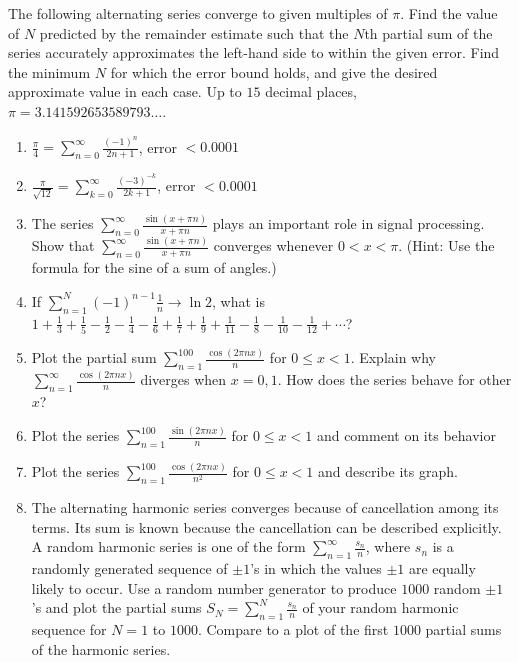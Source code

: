 \documentclass{exercises}
\begin{document}
The following alternating series converge to given multiples of $\pi$. Find the value of $N$ predicted by the remainder estimate such that the $N\text{th}$ partial sum of the series accurately approximates the left-hand side to within the given error. Find the minimum $N$ for which the error bound holds, and give the desired approximate value in each case. Up to $15$ decimal places, $\pi=3.141592653589793\ldots$.

\begin{enumerate}[resume]
\item \techrequired $\frac{\pi}{4}=\sum_{n=0}^{\infty}\frac{{(-1)}^{n}}{2n+1}$, error $<0.0001$
\item \techrequired $\frac{\pi}{\sqrt{12}}=\sum_{k=0}^{\infty}\frac{{(-3)}^{-k}}{2k+1}$, error $<0.0001$
\item \techrequired The series $\sum_{n=0}^{\infty}\frac{\sin(x+\pi n)}{x+\pi n}$ plays an important role in signal processing. Show that $\sum_{n=0}^{\infty}\frac{\sin(x+\pi n)}{x+\pi n}$ converges whenever $0<x<\pi$. (Hint: Use the formula for the sine of a sum of angles.)
\item \techrequired If $\sum_{n=1}^{N}{(-1)}^{n-1}\frac{1}{n}\to \ln 2$, what is $1+\frac{1}{3}+\frac{1}{5}-\frac{1}{2}-\frac{1}{4}-\frac{1}{6}+\frac{1}{7}+\frac{1}{9}+\frac{1}{11}-\frac{1}{8}-\frac{1}{10}-\frac{1}{12}+\cdots$?
\item \techrequired Plot the partial sum $\sum_{n=1}^{100}\frac{\cos(2\pi nx)}{n}$ for $0\le x<1$. Explain why $\sum_{n=1}^{\infty}\frac{\cos(2\pi nx)}{n}$ diverges when $x=0,1$. How does the series behave for other $x$?
\item \techrequired Plot the series $\sum_{n=1}^{100}\frac{\sin(2\pi nx)}{n}$ for $0\le x<1$ and comment on its behavior
\item \techrequired Plot the series $\sum_{n=1}^{100}\frac{\cos(2\pi nx)}{n^{2}}$ for $0\le x<1$ and describe its graph.
\item \techrequired The alternating harmonic series converges because of cancellation among its terms. Its sum is known because the cancellation can be described explicitly. A random harmonic series is one of the form $\sum_{n=1}^{\infty}\frac{s_{n}}{n}$, where $s_{n}$ is a randomly generated sequence of $\pm1$'s in which the values $\pm1$ are equally likely to occur. Use a random number generator to produce $1000$ random $\pm1$'s and plot the partial sums $S_{N}=\sum_{n=1}^{N}\frac{s_{n}}{n}$ of your random harmonic sequence for $N=1$ to $1000$. Compare to a plot of the first $1000$ partial sums of the harmonic series.

\end{enumerate}
\end{document}
